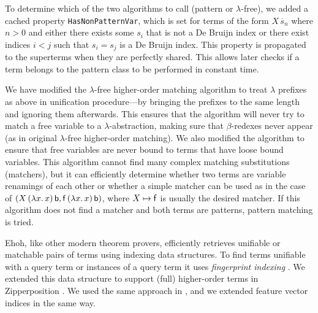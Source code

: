 To determine which of the two algorithms to call (pattern or $\lambda$-free), we
added a cached property \texttt{HasNonPatternVar}, which is set for terms of the
form $X \,
\overline{s}_n$ where $n>0$ and either there exists some $s_i$ that is not a De Bruijn
index or there exist indices $i < j$ such that $s_i = s_j$ is
a De Bruijn index. This property is propagated to the superterms when they are
perfectly shared. This allows later checks if a term belongs to the pattern
class to be performed in constant time.


We have modified the $\lambda$-free higher-order matching algorithm to treat
$\lambda$ prefixes as above in unification procedure---by bringing the prefixes
to the same length and ignoring them afterwards. This ensures that the
algorithm will never try to match a free variable to a $\lambda$-abstraction,
making sure that $\beta$-redexes never appear (as in original $\lambda$-free
higher-order matching). We also modified the algorithm to ensure that free variables
are never bound to terms that have loose bound variables. This algorithm cannot
find many complex matching substitutions (matchers), but it can
efficiently determine whether two terms are variable renamings of each other
or whether a simple matcher can be used as in the case of $(X \, (\lambda x. \,x) \,
\mathsf{b}, \mathsf{f} \, (\lambda x. \,x) \, \mathsf{b})$, where ${X \mapsto \mathsf{f}}$ is
usually the desired matcher. If this algorithm does not find a matcher and both
terms are patterns, pattern matching is tried.

 Ehoh, like other modern theorem provers, efficiently retrieves
unifiable or matchable pairs of terms using indexing data structures. To find
terms unifiable with a query term or instances of a query term it uses
\emph{fingerprint indexing} \cite{ss-12-fp-indexing}. We extended this data
structure to support (full) higher-order terms in Zipperposition
\cite[Sect.~6]{unif-section}. We used the same approach in \ehohii{},
and we extended feature vector indices \cite{ss-2013-feature-vector}
in the same way.

